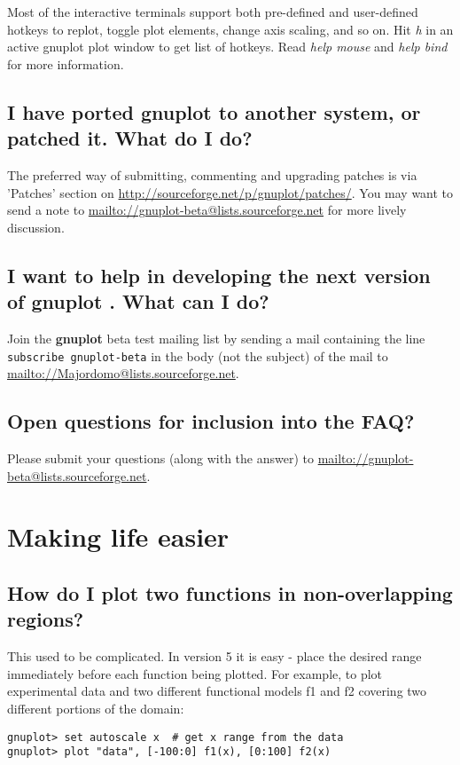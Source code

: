 \documentclass[a4paper,11pt]{article}
\def\http#1{{\small\href{http://#1}{\url{http://#1}}}}
\def\mailto#1{{\small\href{mailto://#1}{\url{mailto://#1}}}}
\newcommand{\mailto}[1]%
            {\htmladdnormallink{\latex{\url{<#1>}}\html{\textit{#1}}}%
                {mailto:#1}%
            }
\newcommand{\http}[1]%
            {\htmladdnormallink{\latex{\url{http://#1}}%
                    \html{\textit{http://#1}}}%
                {http://#1}%
            }
\newcommand{\gnuplot}{\textbf{gnuplot }}
\begin{document}
Most of the interactive terminals support both pre-defined and user-defined
hotkeys to replot, toggle plot elements, change axis scaling, and so on.
Hit \textit{h} in an active gnuplot plot window to get list of hotkeys. 
Read \textit{help mouse} and \textit{help bind} for more information.


\subsection{I have ported \gnuplot to another system, or patched it. What
do I do?}

The preferred way of submitting, commenting and upgrading patches is
via 'Patches' section on 
\http{sourceforge.net/p/gnuplot/patches/}.
You may want to send a note to \mailto{gnuplot-beta@lists.sourceforge.net} for
more lively discussion.


\subsection{I want to help in developing the next version of \gnuplot.
What can I do?}

Join the \gnuplot beta test mailing list by sending a mail
containing the line
\verb+subscribe gnuplot-beta+
in the body (not the subject) of the mail to
\mailto{Majordomo@lists.sourceforge.net}.


\subsection{Open questions for inclusion into the FAQ?}



Please submit your questions (along with the answer) to 
\mailto{gnuplot-beta@lists.sourceforge.net}.


\section{Making life easier}

\subsection{How do I plot two functions in non-overlapping regions?}

This used to be complicated.  In version 5 it is easy - place the
desired range immediately before each function being plotted.
For example, to plot experimental data and two different functional
models f1 and f2 covering two different portions of the domain:
\small
\begin{verbatim}
gnuplot> set autoscale x  # get x range from the data
gnuplot> plot "data", [-100:0] f1(x), [0:100] f2(x)
\end{verbatim}
\normalsize
\end{document}
